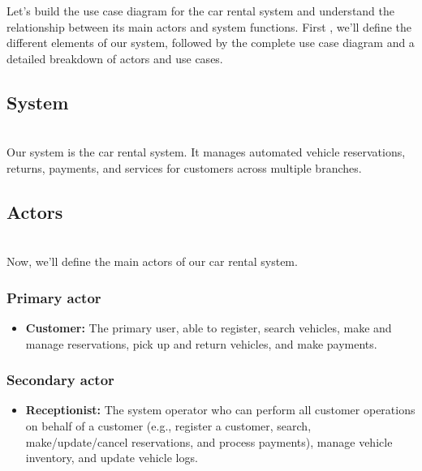 

Let's build the use case diagram for the car rental system and understand the relationship between its main actors and system functions. First , we'll define the different elements of our system, followed by the complete use case diagram and a detailed breakdown of actors and use cases.

\subsection{System}\label{Qti-BXEpmajJZjDodnlJ3}
\\
Our system is the car rental system. It manages automated vehicle reservations, returns, payments, and services for customers across multiple branches.

\subsection{Actors}\label{md76KfgJNtJS5BdYT-j00}
\\
Now, we'll define the main actors of our car rental system.

\subsubsection{Primary actor}\label{1zFV-esUXgtAy1p6d3iU0}

\begin{itemize}
\item
\protect{}\label{0pQr8bAT2qIFfVykPOF0Q}
\textbf{Customer:} The primary user, able to register, search vehicles, make and manage reservations, pick up and return vehicles, and make payments.
\end{itemize}

\subsubsection{Secondary actor}\label{Y1DsPS0gYEbLIMMIUQNR9}

\begin{itemize}
\item
\protect{}\label{VWxEHX7Tlxek5J07GC-M_}
\textbf{Receptionist:} The system operator who can perform all customer operations on behalf of a customer (e.g., register a customer, search, make/update/cancel reservations, and process payments), manage vehicle inventory, and update vehicle logs.
\end{itemize}

